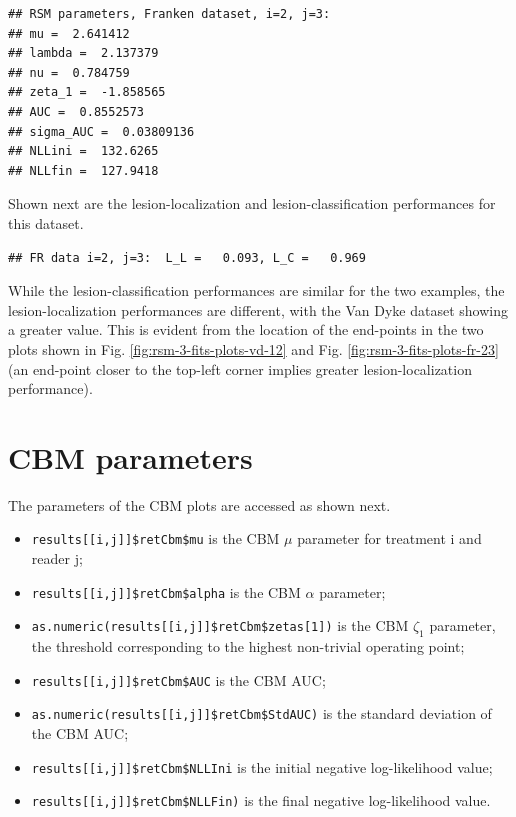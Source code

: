 \documentclass[
]{book}
\providecommand{\tightlist}{%
  \setlength{\itemsep}{0pt}\setlength{\parskip}{0pt}}
\begin{document}
\begin{verbatim}
## RSM parameters, Franken dataset, i=2, j=3: 
## mu =  2.641412 
## lambda =  2.137379 
## nu =  0.784759 
## zeta_1 =  -1.858565 
## AUC =  0.8552573 
## sigma_AUC =  0.03809136 
## NLLini =  132.6265 
## NLLfin =  127.9418
\end{verbatim}

Shown next are the lesion-localization and lesion-classification performances for this dataset.

\begin{verbatim}
## FR data i=2, j=3:  L_L =   0.093, L_C =   0.969
\end{verbatim}

While the lesion-classification performances are similar for the two examples, the lesion-localization performances are different, with the Van Dyke dataset showing a greater value. This is evident from the location of the end-points in the two plots shown in Fig. \ref{fig:rsm-3-fits-plots-vd-12} and Fig. \ref{fig:rsm-3-fits-plots-fr-23} (an end-point closer to the top-left corner implies greater lesion-localization performance).

\hypertarget{rsm-3-fits-cbm-parameters}{%
\section{CBM parameters}\label{rsm-3-fits-cbm-parameters}}

The parameters of the CBM plots are accessed as shown next.

\begin{itemize}
\tightlist
\item
  \texttt{results{[}{[}i,j{]}{]}\$retCbm\$mu} is the CBM \(\mu\) parameter for treatment i and reader j;
\item
  \texttt{results{[}{[}i,j{]}{]}\$retCbm\$alpha} is the CBM \(\alpha\) parameter;\\
\item
  \texttt{as.numeric(results{[}{[}i,j{]}{]}\$retCbm\$zetas{[}1{]})} is the CBM \(\zeta_1\) parameter, the threshold corresponding to the highest non-trivial operating point;
\item
  \texttt{results{[}{[}i,j{]}{]}\$retCbm\$AUC} is the CBM AUC;
\item
  \texttt{as.numeric(results{[}{[}i,j{]}{]}\$retCbm\$StdAUC)} is the standard deviation of the CBM AUC;
\item
  \texttt{results{[}{[}i,j{]}{]}\$retCbm\$NLLIni} is the initial negative log-likelihood value;
\item
  \texttt{results{[}{[}i,j{]}{]}\$retCbm\$NLLFin)} is the final negative log-likelihood value.
\end{itemize}
\end{document}
